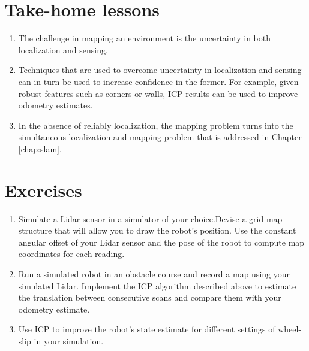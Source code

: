 \section*{Take-home lessons}
\begin{enumerate}
\item The challenge in mapping an environment is the uncertainty in both localization and sensing.
\item Techniques that are used to overcome uncertainty in localization and sensing can in turn be used to increase confidence in the former. For example, given robust features such as corners or walls, ICP results can be used to improve odometry estimates.
\item In the absence of reliably localization, the mapping problem turns into the simultaneous localization and mapping problem that is addressed in Chapter \ref{chap:slam}.
\end{enumerate}

\section*{Exercises}
\begin{enumerate}
\item Simulate a Lidar sensor in a simulator of your choice.Devise a grid-map structure that will allow you to draw the robot's position. Use the constant angular offset of your Lidar sensor and the pose of the robot to compute map coordinates for each reading.
\item Run a simulated robot in an obstacle course and record a map using your simulated Lidar. Implement the ICP algorithm described above to estimate the translation between consecutive scans and compare them with your odometry estimate. 
\item Use ICP to improve the robot's state estimate for different settings of wheel-slip in your simulation.  
\end{enumerate}


%
%
%


